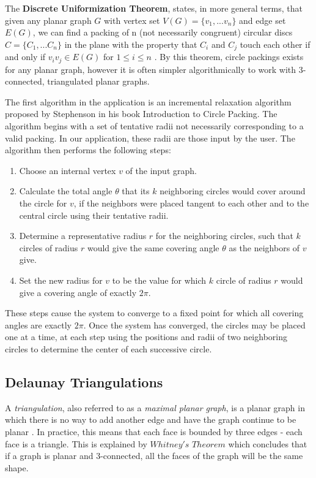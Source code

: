 \documentclass[11pt]{article}
\begin{document}
The \textbf{Discrete Uniformization Theorem}, states, in more general terms, that given any planar graph $G$ with vertex set $V(G) = \{v_1, ... v_n \}$ and edge set $E(G)$, we can find a packing of n (not necessarily congruent) circular discs $C= \{C_1,... C_n\}$ in the plane with the property that $C_i$ and $C_j$ touch each other if and only if $v_i v_j \in E(G)$ for $1 \le i \le n$ \cite{stephenson05introduction}.
By this theorem, circle packings exists for any planar graph, however it is often simpler algorithmically to work with 3-connected, triangulated planar graphs.

The first algorithm in the application is an incremental relaxation algorithm proposed by Stephenson in his book Introduction to Circle Packing. The algorithm begins with a set of tentative radii not necessarily corresponding to a valid packing. In our application, these radii are those input by the user. The algorithm then performs the following steps:
	\begin{enumerate}
		\item Choose an internal vertex $v$ of the input graph.
		\item Calculate the total angle $\theta$ that its $k$ neighboring circles would cover around the circle for $v$, if the neighbors were placed tangent to each other and to the central circle using their tentative radii.
		\item Determine a representative radius $r$ for the neighboring circles, such that $k$ circles of radius $r$ would give the same covering angle $\theta$ as the neighbors of $v$ give.
		\item Set the new radius for $v$ to be the value for which $k$ circle of radius $r$ would give a covering angle of exactly $2\pi$.
	\end{enumerate}
These steps cause the system to converge to a fixed point for which all covering angles are exactly $2\pi$. Once the system has converged, the circles may be placed one at a time, at each step using the positions and radii of two neighboring circles to determine the center of each successive circle.

\subsection{Delaunay Triangulations}
	A \emph{triangulation}, also referred to as a \emph{maximal planar graph}, is a planar graph in which there is no way to add another edge and have the graph continue to be planar \cite{meshGeneration}. In practice, this means that each face is bounded by three edges - each face is a triangle. This is explained by $Whitney's$ $Theorem$ which concludes that if a graph is planar and 3-connected, all the faces of the graph will be the same shape.
\end{document}
